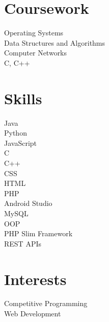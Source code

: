 \documentclass[]{deedy-resume-openfont}
\begin{document}
\begin{minipage}[t]{0.33\textwidth}
\section{Coursework}

\textbullet{} Operating Systems \\
\textbullet{} Data Structures and Algorithms \\
\textbullet{} Computer Networks \\
\sectionsep
{}
\textbullet{} C, C++
\sectionsep


\section{Skills}
\textbullet{} Java\\
\textbullet{} Python\\
\textbullet{} JavaScript\\
\textbullet{} C\\
\textbullet{} C++\\
\textbullet{} CSS\\
\textbullet{} HTML\\
\textbullet{} PHP\\
\sectionsep
{}
\textbullet{} Android Studio\\
\textbullet{} MySQL\\
\textbullet{} OOP\\
\textbullet{} PHP Slim Framework\\
\textbullet{} REST APIs\\
\sectionsep


\section{Interests}
\textbullet{} Competitive Programming\\
\textbullet{} Web Development\\

%
%

\end{minipage} 
\hfill
\end{document}
